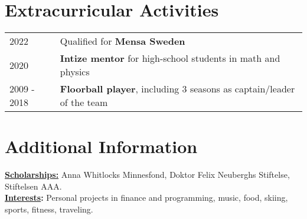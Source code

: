 \documentclass[a4paper,11pt]{article}
\begin{document}
\section{Extracurricular Activities}
\begin{tabularx}{\linewidth}{ @{}l X@{}}
2022 & Qualified for \textbf{Mensa Sweden} \\[5pt]
2020 & \textbf{Intize mentor} for high-school students in math and physics \\[5pt]
2009 - 2018 & \textbf{Floorball player}, including 3 seasons as captain/leader of the team
\end{tabularx}
\section{Additional Information}
\textbf{\underline{Scholarships:}} Anna Whitlocks Minnesfond, Doktor Felix Neuberghs Stiftelse, Stiftelsen AAA. \\[8pt]
\textbf{\underline{Interests}:} Personal projects in finance and programming, music, food, skiing, sports, fitness, traveling.
\end{document}
